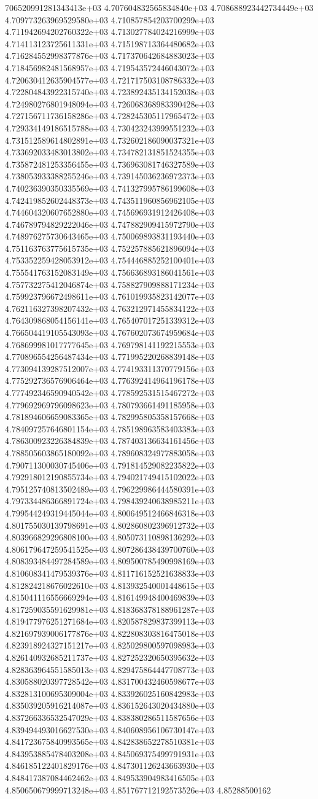 706520991281343413e+03	4.707604832565834840e+03	4.708688923442734449e+03	4.709773263969529580e+03	4.710857854203700299e+03	4.711942694202760322e+03	4.713027784024216999e+03	4.714113123725611331e+03	4.715198713364480682e+03	4.716284552998377876e+03	4.717370642684883023e+03	4.718456982481568957e+03	4.719543572446043072e+03	4.720630412635904577e+03	4.721717503108786332e+03	4.722804843922315740e+03	4.723892435134152038e+03	4.724980276801948094e+03	4.726068368983390428e+03	4.727156711736158286e+03	4.728245305117965472e+03	4.729334149186515788e+03	4.730423243999551232e+03	4.731512589614802891e+03	4.732602186090037321e+03	4.733692033483013802e+03	4.734782131851524355e+03	4.735872481253356455e+03	4.736963081746327589e+03	4.738053933388255246e+03	4.739145036236972373e+03	4.740236390350335569e+03	4.741327995786199608e+03	4.742419852602448373e+03	4.743511960856962105e+03	4.744604320607652880e+03	4.745696931912426408e+03	4.746789794829222046e+03	4.747882909415972790e+03	4.748976275730643465e+03	4.750069893831193440e+03	4.751163763775615735e+03	4.752257885621896094e+03	4.753352259428053912e+03	4.754446885252100401e+03	4.755541763152083149e+03	4.756636893186041561e+03	4.757732275412046874e+03	4.758827909888171234e+03	4.759923796672498611e+03	4.761019935823142077e+03	4.762116327398207432e+03	4.763212971455834122e+03	4.764309868054156141e+03	4.765407017251339312e+03	4.766504419105543093e+03	4.767602073674959684e+03	4.768699981017777645e+03	4.769798141192215553e+03	4.770896554256487434e+03	4.771995220268839148e+03	4.773094139287512007e+03	4.774193311370779156e+03	4.775292736576906464e+03	4.776392414964196178e+03	4.777492346590940542e+03	4.778592531515467272e+03	4.779692969796098623e+03	4.780793661491185958e+03	4.781894606659083365e+03	4.782995805358157668e+03	4.784097257646801154e+03	4.785198963583403383e+03	4.786300923226384839e+03	4.787403136634161456e+03	4.788505603865180092e+03	4.789608324977883058e+03	4.790711300030745406e+03	4.791814529082235822e+03	4.792918012190855734e+03	4.794021749415102022e+03	4.795125740813502489e+03	4.796229986444580391e+03	4.797334486366891724e+03	4.798439240638985211e+03	4.799544249319445044e+03	4.800649512466846318e+03	4.801755030139798691e+03	4.802860802396912732e+03	4.803966829296808100e+03	4.805073110898136292e+03	4.806179647259541525e+03	4.807286438439700760e+03	4.808393484497284589e+03	4.809500785490998169e+03	4.810608341479539376e+03	4.811716152521638833e+03	4.812824218676022610e+03	4.813932540001448615e+03	4.815041116556669294e+03	4.816149948400469839e+03	4.817259035591629981e+03	4.818368378188961287e+03	4.819477976251271684e+03	4.820587829837399113e+03	4.821697939006177876e+03	4.822808303816475018e+03	4.823918924327151217e+03	4.825029800597098983e+03	4.826140932685211737e+03	4.827252320650395632e+03	4.828363964551585013e+03	4.829475864447708773e+03	4.830588020397728542e+03	4.831700432460598677e+03	4.832813100695309004e+03	4.833926025160842983e+03	4.835039205916214087e+03	4.836152643020434880e+03	4.837266336532547029e+03	4.838380286511587656e+03	4.839494493016627530e+03	4.840608956106730147e+03	4.841723675840993565e+03	4.842838652278510381e+03	4.843953885478403208e+03	4.845069375499791931e+03	4.846185122401829176e+03	4.847301126243663930e+03	4.848417387084462462e+03	4.849533904983416505e+03	4.850650679999713248e+03	4.851767712192573526e+03	4.85288500162
